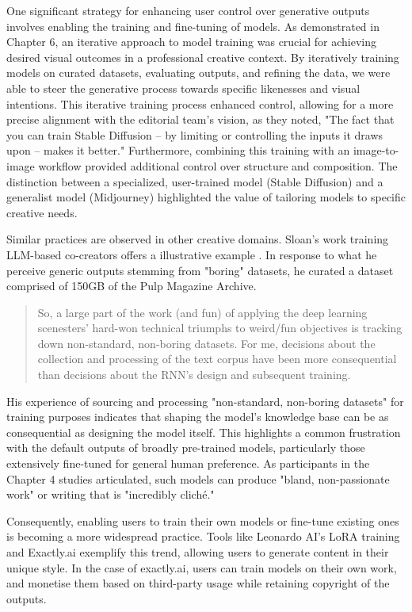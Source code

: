 One significant strategy for enhancing user control over generative outputs involves enabling the training and fine-tuning of models. As demonstrated in Chapter 6, an iterative approach to model training was crucial for achieving desired visual outcomes in a professional creative context. By iteratively training models on curated datasets, evaluating outputs, and refining the data, we were able to steer the generative process towards specific likenesses and visual intentions. This iterative training process enhanced control, allowing for a more precise alignment with the editorial team's vision, as they noted, "The fact that you can train Stable Diffusion – by limiting or controlling the inputs it draws upon – makes it better." Furthermore, combining this training with an image-to-image workflow provided additional control over structure and composition. The distinction between a specialized, user-trained model (Stable Diffusion) and a generalist model (Midjourney) highlighted the value of tailoring models to specific creative needs.

Similar practices are observed in other creative domains. Sloan's work training LLM-based co-creators offers a illustrative example \cite{Sloan2016-fj}. In response to what he perceive generic outputs stemming from "boring" datasets, he curated a dataset comprised of 150GB of the Pulp Magazine Archive.

\begin{quote}
    So, a large part of the work (and fun) of applying the deep learning scenesters' hard-won technical triumphs to weird/fun objectives is tracking down non-standard, non-boring datasets. For me, decisions about the collection and processing of the text corpus have been more consequential than decisions about the RNN's design and subsequent training.
\end{quote}


His experience of sourcing and processing "non-standard, non-boring datasets" for training purposes indicates that shaping the model's knowledge base can be as consequential as designing the model itself. This highlights a common frustration with the default outputs of broadly pre-trained models, particularly those extensively fine-tuned for general human preference. As participants in the Chapter 4 studies articulated, such models can produce "bland, non-passionate work" or writing that is "incredibly cliché."

Consequently, enabling users to train their own models or fine-tune existing ones is becoming a more widespread practice. Tools like Leonardo AI's LoRA training and Exactly.ai exemplify this trend, allowing users to generate content in their unique style. In the case of exactly.ai, users can train models on their own work, and monetise them based on third-party usage while retaining copyright of the outputs. 

